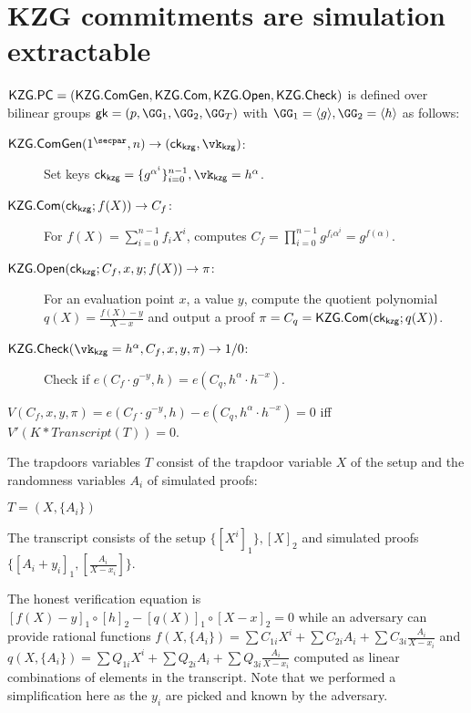 \documentclass[runningheads,11pt]{llncs}
\begin{document}
\def\open{{\sf Open}}
\def\check{{\sf Check}}
\def\gk{{\sf gk}}

\def\ck{{\sf ck}}
\newcommand{\secp}{\lambda}

\section{KZG commitments are simulation extractable}
$\Kzg.\PC = (\Kzg.\cgen,\Kzg.\CM,\allowbreak  \Kzg.\open,\allowbreak \Kzg.\check)$ is defined over bilinear groups $\gk=(p,\GG_1,\allowbreak \GG_2, \allowbreak \GG_T )$ with $\GG_1 =\langle g\rangle, \GG_2 =\langle h \rangle$ as follows:
\begin{description}%
\item[$\Kzg.\cgen(1^\secpar, n) \to (\ck_\kzg, \vk_\kzg)$:] Set keys
$\ck_\kzg = \{g^{\alpha^i}\}_{i=0}^{n-1}, \allowbreak\vk_\kzg = h^\alpha$.
\item[$\Kzg.\CM(\ck_\kzg; f(X)) \to C_f$:]  For $f(X) = \sum_{i=0}^{n-1} f_i X^i$, computes  $C_f=\prod _{i=0}^{n-1} g^{f_i \alpha^i} = g^{f(\alpha)} $.
\item[$\Kzg.\open(\ck_\kzg; C_f, x, y; f(X)) \to \pi$:] For an evaluation point $x$, a value $y$, compute the quotient  polynomial $q(X) = \displaystyle\frac{f(X) -y }{X-x}$ and output a proof $\pi = C_q = \Kzg.\CM(\ck_\kzg; q(X)) $.
\item[$\Kzg.\check(\vk_\kzg = h^\alpha, C_f, x, y, \pi) \to 1/0$:] Check if $e(C_f \cdot  g^{-y}, h)=e(C_q , h^{\alpha}\cdot h^{-x})$.
\end{description}

$V(C_{f},x,y,\pi) =  e(C_f \cdot  g^{-y}, h) - e(C_q , h^{\alpha}\cdot h^{-x}) = 0$ iff $V'(K * Transcript (T)) = 0$.

The trapdoors variables $T$ consist of the trapdoor variable $X$ of the setup and the randomness variables $A_{i}$ of simulated proofs:

$T=(X, \{A_{i}\})$

The transcript consists of the setup $\{[X^{i}]_{1}\}, [X]_{2}$ and simulated proofs $\{[A_{i} + y_{i}]_{1}, [\frac{A_{i}}{X-x_{i}}]\}$.

The honest verification equation is
$[f(X) - y]_1 \circ [h]_{2} - [q(X)]_1 \circ [X-x]_{2}=0$
while an adversary can provide rational functions
$f(X, \{A_{i}\}) = \sum C_{1i} X^{i} + \sum C_{2i} A_{i} + \sum C_{3i} \frac{A_{i}}{X-x_{i}}$ and
$q(X, \{A_{i}\}) = \sum Q_{1i} X^{i} + \sum Q_{2i} A_{i} + \sum Q_{3i} \frac{A_{i}}{X-x_{i}}$ computed as linear combinations of elements in the transcript. Note that we performed a simplification here as the $y_{i}$ are picked and known by the adversary.
\end{document}
